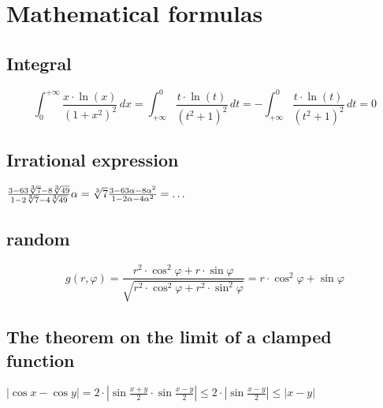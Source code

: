 \documentclass[14pt,a4paper]{report}
\begin{document}
\chapter{Mathematical formulas}
\section{Integral}
\[ \int_{0}^{+\infty} \frac{x \cdot \ln(x)}{(1 + x^2 )^2}\,dx = \int_{+\infty}^{0} \frac{t \cdot \ln(t)}{(t^2 + 1)^2}\, dt = - \int_{+\infty}^{0} \frac{t\cdot \ln(t)}{(t^2 + 1)^2}\, dt = 0\]

\section{Irrational expression}
\begin{math}
\frac{3-63\sqrt[3]{7}-8\sqrt[3]{49}}{1-2\sqrt[3]{7}-4\sqrt[3]{49}}\\\\
\alpha = \sqrt[3]{7} \\\\
\frac{3-63\alpha - 8\alpha^2}{1-2\alpha-4\alpha^2} = \ldots
\end{math}

\section{random}
$$g(r,\varphi) = \frac{r^2 \cdot \cos^2{\varphi} + r \cdot \sin{\varphi}}{\sqrt{r^2 \cdot \cos^2{\varphi} +r^2 \cdot \sin^2{\varphi}}} = r \cdot \cos^2{\varphi} + \sin{\varphi}$$

\section{The theorem on the limit of a clamped function}
$|\cos{x} - \cos{y}| = 2\cdot |\sin{\frac{x+y}{2}} \cdot \sin{\frac{x-y}{2}}| \le 2\cdot |\sin{\frac{x-y}{2}}| \le |x-y|$




\end{document}
